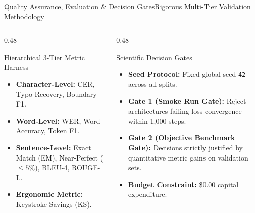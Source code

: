 \documentclass[aspectratio=169,10pt]{beamer}
\begin{document}
\begin{frame}{Quality Assurance, Evaluation \& Decision Gates}{Rigorous Multi-Tier Validation Methodology}
  \begin{columns}[T]
    \begin{column}{0.48\textwidth}
      \begin{block}{Hierarchical 3-Tier Metric Harness}
        \begin{itemize}\setlength{\itemsep}{1.5pt}\footnotesize
          \item \textbf{Character-Level:} CER, Typo Recovery, Boundary F1.
          \item \textbf{Word-Level:} WER, Word Accuracy, Token F1.
          \item \textbf{Sentence-Level:} Exact Match (EM), Near-Perfect ($\le 5\%$), BLEU-4, ROUGE-L.
          \item \textbf{Ergonomic Metric:} Keystroke Savings (KS).
        \end{itemize}
      \end{block}
    \end{column}

    \begin{column}{0.48\textwidth}
      \begin{block}{Scientific Decision Gates}
        \begin{itemize}\setlength{\itemsep}{1.5pt}\footnotesize
          \item \textbf{Seed Protocol:} Fixed global seed \texttt{42} across all splits.
          \item \textbf{Gate 1 (Smoke Run Gate):} Reject architectures failing loss convergence within 1,000 steps.
          \item \textbf{Gate 2 (Objective Benchmark Gate):} Decisions strictly justified by quantitative metric gains on validation sets.
          \item \textbf{Budget Constraint:} \$0.00 capital expenditure.
        \end{itemize}
      \end{block}
    \end{column}
  \end{columns}
\end{frame}
\end{document}
